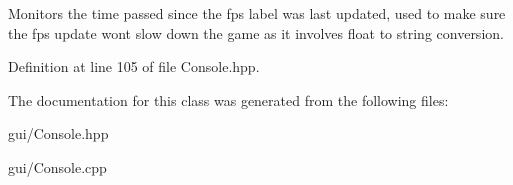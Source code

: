 Monitors the time passed since the fps label was last updated, used to make sure the fps update won\textquotesingle{}t slow down the game as it involves float to string conversion. 



Definition at line 105 of file Console.\+hpp.



The documentation for this class was generated from the following files\+:\begin{DoxyCompactItemize}
\item 
gui/Console.\+hpp\item 
gui/Console.\+cpp\end{DoxyCompactItemize}
